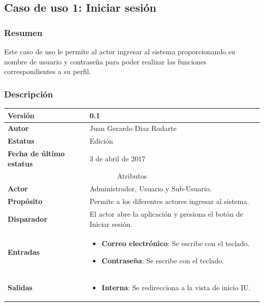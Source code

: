 \subsection{Caso de uso 1: Iniciar sesión} \label{cu1}
\subsubsection{Resumen}
Este caso de uso le permite al actor ingresar al sistema proporcionando su nombre de usuario y contraseña para poder realizar las funciones correspondientes a su perfil.
\subsubsection{Descripción}
\begingroup
\setlength{\LTleft}{-10cm plus -1fill}
\setlength{\LTright}{\LTleft}
\begin{center}  
   \label{tab:cu1_tab}
  \begin{longtable}{| p{3.5cm} | p{11.5cm} |}
      	\hline
      		\textbf{Versión} &  0.1 \\
        \hline 
       		\textbf{Autor} & Juan Gerardo Diaz Rodarte\\
        \hline
          \textbf{Estatus} & Edición \\
        \hline  
          \textbf{Fecha de último estatus} &  3 de abril de 2017 \\
        \hline
      \multicolumn{2}{|c|}{\large{Atributos}} \\
        \hline
          \textbf{Actor}  & Administrador, Usuario y Sub-Usuario. \\
        \hline	
          \textbf{Propósito} & Permite a los diferentes actores ingresar al sistema. \\
        \hline
          \textbf{Disparador} & El actor abre la aplicación y presiona el botón de Iniciar sesión. \\
        \hline	
          \textbf{Entradas} & 
            \begin{itemize}
              \item \textbf{Correo electrónico}: Se escribe con el teclado.
              \item \textbf{Contraseña}: Se escribe con el teclado.
            \end{itemize} \\
        \hline	
          \textbf{Salidas} & 
            \begin{itemize}
              \item \textbf{Interna}: Se redirecciona a la vista de inicio IU.

\end{itemize}
\end{longtable}
\end{center}
